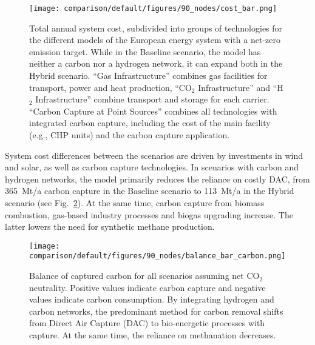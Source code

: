 \documentclass[twocolumn]{article}
\newcommand{\carbon}{CO$_2$}
\newcommand{\hydrogen}{H$_2$}
\newcommand{\baselinescenario}{Baseline scenario}
\newcommand{\hybridscenario}{Hybrid scenario}
\begin{document}
\begin{figure}[ht!]
    \centering
    \texttt{[image: comparison/default/figures/90\_nodes/cost\_bar.png]}
    \caption[short]{Total annual system cost, subdivided into groups of technologies for the different models of the European energy system with a net-zero emission target. While in the \baselinescenario{}, the model has neither a carbon nor a hydrogen network, it can expand both in the \hybridscenario{}. ``Gas Infrastructure'' combines gas facilities for transport, power and heat production, ``\carbon{} Infrastructure'' and ``\hydrogen{} Infrastructure'' combine transport and storage for each carrier. ``Carbon Capture at Point Sources'' combines all technologies with integrated carbon capture, including the cost of the main facility (e.g., CHP units) and the carbon capture application.}
    \label{fig:cost_bar}
\end{figure}


System cost differences between the scenarios are driven by investments in wind and solar, as well as carbon capture technologies. In scenarios with carbon and hydrogen networks, the model primarily reduces the reliance on costly DAC, from 365~Mt/a carbon capture in the \baselinescenario{} to 113~Mt/a in the \hybridscenario{} (see Fig.~\ref{fig:balance_captured_carbon}). At the same time, carbon capture from biomass combustion, gas-based industry processes and biogas upgrading increase. The latter lowers the need for synthetic methane production.

\begin{figure}[ht!]
    \centering
    \texttt{[image: comparison/default/figures/90\_nodes/balance\_bar\_carbon.png]}
    \caption{Balance of captured carbon for all scenarios assuming net \carbon{} neutrality. Positive values indicate carbon capture and negative values indicate carbon consumption. By integrating hydrogen and carbon networks, the predominant method for carbon removal shifts from Direct Air Capture (DAC) to bio-energetic processes with capture. At the same time, the reliance on methanation decreases.}
    \label{fig:balance_captured_carbon}
\end{figure}
\end{document}

